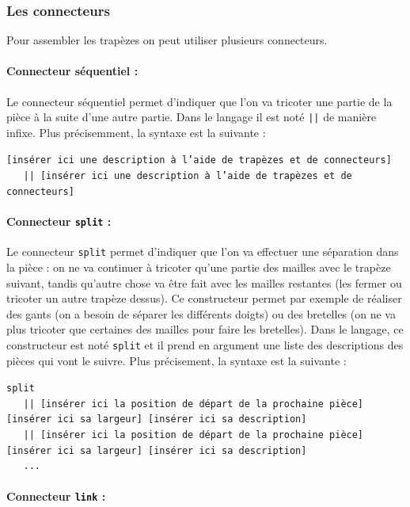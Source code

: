 \documentclass[a4paper,10pt]{article}
\begin{document}
\subsubsection{Les connecteurs}

Pour assembler les trapèzes on peut utiliser plusieurs connecteurs.

\paragraph{Connecteur séquentiel :}

Le connecteur séquentiel permet d'indiquer que l'on va tricoter une partie de la pièce à la suite d'une autre partie. Dans le langage il est noté \texttt{||} de manière infixe. Plus précisemment, la syntaxe est la suivante :

\texttt{[insérer ici une description à l'aide de trapèzes et de connecteurs] \\
  \textcolor{white}{ali}|| [insérer ici une description à l'aide de trapèzes et de connecteurs]}
  
\paragraph{Connecteur \texttt{split} :} 

Le connecteur \texttt{split} permet d'indiquer que l'on va effectuer une séparation dans la pièce : on ne va continuer à tricoter qu'une partie des mailles avec le trapèze suivant, tandis qu'autre chose va être fait avec les mailles restantes (les fermer ou tricoter un autre trapèze dessus). Ce constructeur permet par exemple de réaliser des gants (on a besoin de séparer les différents doigts) ou des bretelles (on ne va plus tricoter que certaines des mailles pour faire les bretelles). Dans le langage, ce constructeur est noté \texttt{split} et il prend en argument une liste des descriptions des pièces qui vont le suivre. Plus précisement, la syntaxe est la suivante :

\noindent \texttt{split \\
  \textcolor{white}{ali}|| [insérer ici la position de départ de la prochaine pièce] [insérer ici sa largeur] [insérer ici sa description] \\
  \textcolor{white}{ali}|| [insérer ici la position de départ de la prochaine pièce] [insérer ici sa largeur] [insérer ici sa description] \\
  \textcolor{white}{ali}...}
  
\paragraph{Connecteur \texttt{link} :} 
\end{document}
